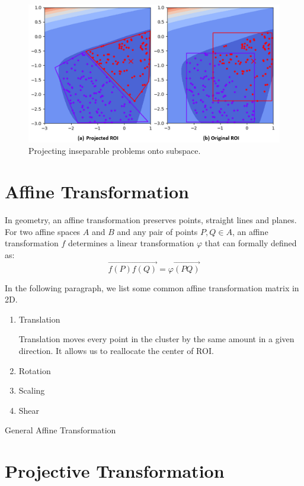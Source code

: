 \begin{figure}
\centering
\includegraphics[width=\textwidth]{Projected_ROI}
\caption{Projecting inseparable problems onto subspace.}\label{fig:Projected_ROI}
\end{figure}



\section{Affine Transformation}
In geometry, an affine transformation preserves points, straight lines and planes.
For two affine spaces $A$ and $B$ and any pair of points $P, Q \in A$,
an affine transformation $f$ determines a linear transformation $\varphi$ that can formally defined as:
\begin{displaymath}
\overrightarrow{f(P)f(Q)} = \varphi \overrightarrow{(PQ)}
\end{displaymath}

In the following paragraph, we list some common affine transformation matrix in 2D.
\begin{enumerate}
    \item Translation 
            
            Translation moves every point in the cluster by the same amount in a given direction.
            It allows us to reallocate the center of ROI.

    \item Rotation 
    \item Scaling 
    \item Shear 
\end{enumerate} 

General Affine Transformation






\section{Projective Transformation}


